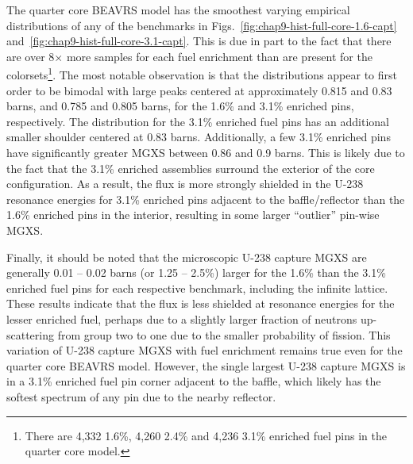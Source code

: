 
The quarter core \ac{BEAVRS} model has the smoothest varying empirical distributions of any of the benchmarks in Figs.~\ref{fig:chap9-hist-full-core-1.6-capt} and~\ref{fig:chap9-hist-full-core-3.1-capt}. This is due in part to the fact that there are over 8$\times$ more samples for each fuel enrichment than are present for the colorsets\footnote{There are 4,332 1.6\%, 4,260 2.4\% and 4,236 3.1\% enriched fuel pins in the quarter core model.}. The most notable observation is that the distributions appear to first order to be bimodal with large peaks centered at approximately 0.815 and 0.83 barns, and 0.785 and 0.805 barns, for the 1.6\% and 3.1\% enriched pins, respectively. The distribution for the 3.1\% enriched fuel pins has an additional smaller shoulder centered at 0.83 barns. Additionally, a few 3.1\% enriched pins have significantly greater \ac{MGXS} between 0.86 and 0.9 barns. This is likely due to the fact that the 3.1\% enriched assemblies surround the exterior of the core configuration. As a result, the flux is more strongly shielded in the U-238 resonance energies for 3.1\% enriched pins adjacent to the baffle/reflector than the 1.6\% enriched pins in the interior, resulting in some larger ``outlier'' pin-wise \ac{MGXS}.

Finally, it should be noted that the microscopic U-238 capture \ac{MGXS} are generally 0.01 -- 0.02 barns (or 1.25 -- 2.5\%) larger for the 1.6\% than the 3.1\% enriched fuel pins for each respective benchmark, including the infinite lattice. These results indicate that the flux is less shielded at resonance energies for the lesser enriched fuel, perhaps due to a slightly larger fraction of neutrons up-scattering from group two to one due to the smaller probability of fission. This variation of U-238 capture \ac{MGXS} with fuel enrichment remains true even for the quarter core \ac{BEAVRS} model. However, the single largest U-238 capture \ac{MGXS} is in a 3.1\% enriched fuel pin corner adjacent to the baffle, which likely has the softest spectrum of any pin due to the nearby reflector.


